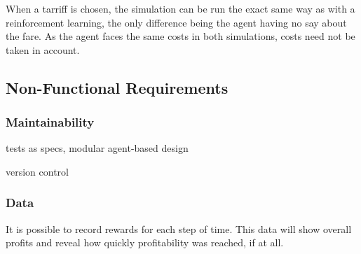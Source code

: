 When a tarriff is chosen, the simulation can be run the exact same way as with
a reinforcement learning, the only difference being the agent having no say
about the fare. As the agent faces the same costs in both simulations, costs
need not be taken in account.

\subsection{Non-Functional Requirements}

\subsubsection{Maintainability}

tests as specs, modular agent-based design

version control

\subsubsection{Data}

It is possible to record rewards for each step of time. This data will show
overall profits and reveal how quickly profitability was reached, if at all.
